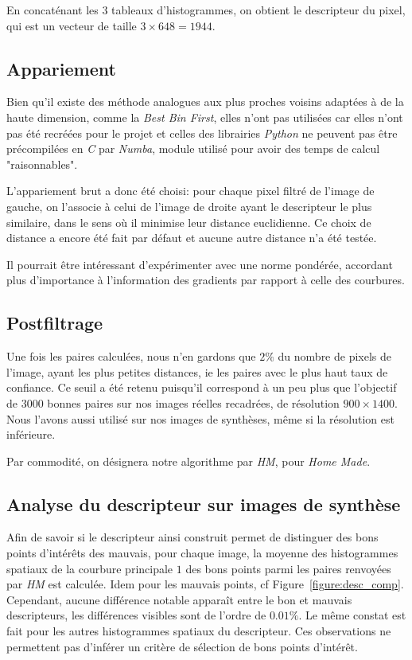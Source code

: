 \documentclass[
	a4paper, %
	10pt, %
	unnumberedsections, %
	twoside, %
]{LTJournalArticle}
\begin{document}
En concaténant les $3$ tableaux d'histogrammes, on obtient le descripteur du pixel,
qui est un vecteur de taille $3 \times 648 = 1944$.


\subsection{Appariement}

Bien qu'il existe des méthode analogues aux plus proches voisins adaptées à de la haute dimension,
comme la \textit{Best Bin First}, elles n'ont pas utilisées car elles n'ont
pas été recréées pour le projet et celles des librairies \textit{Python} ne peuvent pas être
précompilées en \textit{C} par \textit{Numba}, module utilisé pour avoir des temps
de calcul "raisonnables".

L'appariement brut a donc été choisi: pour chaque pixel filtré de l'image de gauche,
on l'associe à celui de l'image de droite ayant le descripteur le plus similaire,
dans le sens où il minimise leur distance euclidienne.
Ce choix de distance a encore été fait par défaut et aucune autre distance
n'a été testée.

Il pourrait être intéressant d'expérimenter avec une norme pondérée, accordant plus d'importance
à l'information des gradients par rapport à celle des courbures.

\subsection{Postfiltrage}
Une fois les paires calculées, nous n'en gardons que $2 \%$ du nombre de pixels de l'image,
ayant les plus petites distances, ie les paires avec le plus haut taux
de confiance. Ce seuil a été retenu puisqu'il correspond à un peu plus que
l'objectif de $3000$ bonnes paires sur nos images réelles recadrées, de résolution
$900 \times 1400$.
Nous l'avons aussi utilisé sur nos images de synthèses, même si la résolution est inférieure.

Par commodité, on désignera notre algorithme
par \textit{HM}, pour \textit{Home Made}.

\subsection{Analyse du descripteur sur images de synthèse}

Afin de savoir si le descripteur ainsi construit permet de distinguer
des bons points d'intérêts des mauvais,
pour chaque image, la moyenne des histogrammes spatiaux de
la courbure principale $1$ des bons points parmi les paires
renvoyées par \textit{HM} est calculée. Idem pour les mauvais points, cf Figure~\ref{figure:desc_comp}.
Cependant, aucune différence notable apparaît entre le bon et mauvais descripteurs,
les différences visibles sont de l'ordre de $0.01 \%$.
Le même constat est fait pour les autres histogrammes spatiaux du
descripteur. Ces observations ne
permettent pas d'inférer un critère de sélection de bons points d'intérêt.
\end{document}

